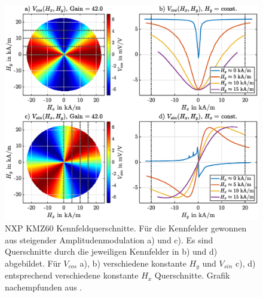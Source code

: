 	
	\clearpage
	\begin{figure}[tbph]
		\centering
		\includegraphics[width=\linewidth]{chapters/images/KMZ60_Kennfeld_Steigend}
		\caption[NXP KMZ60 Kennfeldquerschnitte]{NXP KMZ60 Kennfeldquerschnitte. Für die Kennfelder gewonnen aus 
		steigender Amplitudenmodulation a) und c). Es sind Querschnitte durch die jeweiligen Kennfelder in b) und d) 
		abgebildet. Für $V_{cos}$ a), b) verschiedene konstante $H_y$ und $V_{sin}$ c), d) entsprechend verschiedene 
		konstante $H_x$ Querschnitte. Grafik nachempfunden aus \cite{Schuethe2019}.}
		\label{fig:kmz60kennfeldsteigend}
	\end{figure}
	
